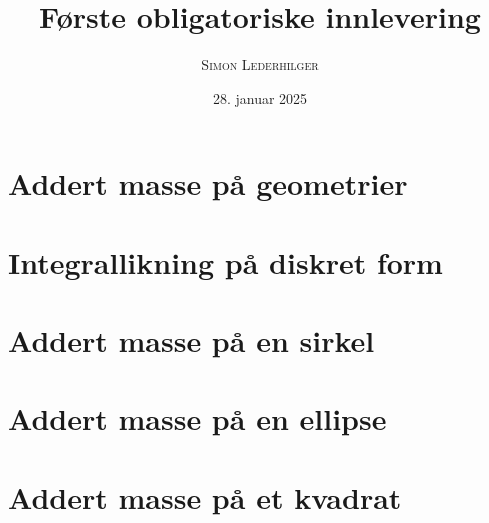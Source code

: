 \documentclass{article}
\title{Første obligatoriske innlevering}
\subtitle{\textit{\headcourse}}
\author{\textsc{Simon Lederhilger}}
\date{28. januar 2025}
\begin{document}
\maketitle\thispagestyle{fancy}
\begin{multicols*}{2}
    \section[Addert masse]{Addert masse på geometrier}
    

    \section[Diskret form]{Integrallikning på diskret form}
    

    \section[Sirkel]{Addert masse på en sirkel}
    

    \section[Ellipse]{Addert masse på en ellipse}
    

    \section[Kvadrat]{Addert masse på et kvadrat}
    

\end{multicols*}
\end{document}
